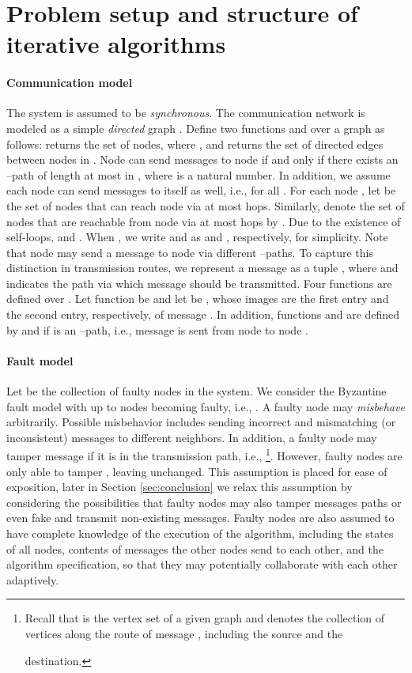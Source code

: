 \documentclass[letterpaper, 11pt]{article}
\begin{document}
\section{Problem setup and structure of iterative algorithms}
\label{sec: model}
\paragraph{Communication model}
The system is assumed to be {\em synchronous}.
The communication network is modeled as a simple {\em directed} graph . Define two functions  and  over a graph  as follows:   returns the set of  nodes, where , and  returns the set of directed edges between nodes in . Node  can send messages to node  if and only if there exists an --path of length at most  in , where  is a natural number.
In addition, we assume each node can send messages to itself as well, i.e.,  for all . For each node , let  be the set of nodes that can reach node  via at most  hops.
Similarly, denote the set of nodes that are reachable from node  via at most  hops by . Due to the existence of self-loops,  and . When , we write  and  as  and , respectively, for simplicity.
Note that node  may send a message to node  via different --paths. To capture this distinction in transmission routes, we represent a message as a tuple , where  and  indicates the path via which message  should be transmitted. Four functions are defined over . Let function  be  and let   be , whose images are the first entry and the second entry, respectively, of message . In addition, functions  and  are defined by   and  if   is an --path, i.e., message  is sent from node  to node .








\paragraph{Fault model}
Let  be the collection of faulty nodes in the system. We consider the Byzantine fault model with up to  nodes becoming faulty, i.e., .  A faulty node may {\em misbehave} arbitrarily. Possible misbehavior includes sending incorrect and mismatching (or inconsistent) messages to different neighbors. In addition, a faulty node  may tamper message  if it is in the transmission path, i.e., \footnote{Recall that  is the vertex set of a given graph and  denotes the collection of vertices along the route of message , including the source and the

  destination.}.
However, faulty nodes are only able to tamper , leaving  unchanged. This assumption is placed for ease of exposition, later in Section \ref{sec:conclusion} we relax this assumption by considering the possibilities that faulty nodes may also tamper messages paths or even fake and transmit non-existing messages.
Faulty nodes are also assumed to have complete knowledge of the execution of the algorithm, including the states of all nodes,
contents of messages the other nodes send to each other, and
the algorithm specification, so that they may potentially collaborate with each other adaptively.
\end{document}

